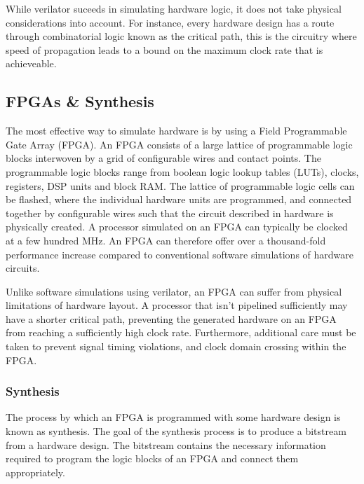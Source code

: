 \documentclass[a4paper,8pt]{report}
\begin{document}
While verilator suceeds in simulating hardware logic, it does not take physical
considerations into account. For instance, every hardware design has a route through
combinatorial logic known as the critical path, this is the circuitry where
speed of propagation leads to a bound on the maximum clock rate that is
achieveable.


\subsection{FPGAs \& Synthesis}
The most effective way to simulate hardware is by using a Field Programmable
Gate Array (FPGA). An FPGA consists of a large lattice of programmable logic
blocks interwoven by a grid of configurable wires and contact points. The
programmable logic blocks range from boolean logic lookup tables (LUTs), clocks,
registers, DSP units and block RAM. The lattice of programmable logic cells can
be flashed, where the individual hardware units are programmed, and connected
together by configurable wires such that the circuit described in hardware is
physically created. A processor simulated on an FPGA can typically be clocked at
a few hundred MHz. An FPGA can therefore offer over a thousand-fold performance
increase compared to conventional software simulations of hardware circuits.

Unlike software simulations using verilator, an FPGA can suffer from physical
limitations of hardware layout. A processor that isn't pipelined sufficiently
may have a shorter critical path, preventing the generated hardware on an FPGA
from reaching a sufficiently high clock rate. Furthermore, additional care must
be taken to prevent signal timing violations, and clock domain crossing within
the FPGA.


\subsubsection{Synthesis}
The process by which an FPGA is programmed with some hardware design is known
as synthesis. The goal of the synthesis process is to produce a bitstream from a
hardware design. The bitstream contains the necessary information required to
program the logic blocks of an FPGA and connect them appropriately.
\end{document}

